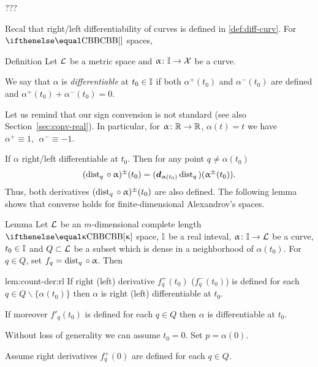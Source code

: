 ???
\qeds

Recal that right/left differentiability of curves is defined in \ref{def:diff-curv}.
For $\Alex{}$ spaces, 

\begin{thm}{Definition}\label{def:diff-curv???}
Let
$\mathcal{L}$ be a metric space 
and $\alpha\:\II\to \spc{X}$ be a curve.

We say that $\alpha$ is \emph{differentiable} at $t_0\in\II$ if 
both $\alpha^+(t_0)$ and $\alpha^-(t_0)$ are defined and $\alpha^+(t_0)+\alpha^-(t_0)=0$.
\end{thm}





Let us remind that our sign convension is not standard (see also Section~\ref{sec:conv-real}). 
In particular, for $\alpha\:\RR\to \RR$, $\alpha(t)=t$ we have $\alpha^+\equiv 1,\ \ \alpha^-\equiv -1$.

If $\alpha$ right/left differentiable at $t_0$.
Then for any point $q\not=\alpha(t_0)$
\[(\distfun{q}{}{}\circ\alpha)^\pm(t_0)
=
(\d_{\alpha(t_0)}\distfun{q}{}{})(\alpha^\pm(t_0)).\]
Thus, both derivatives $(\distfun{q}{}{}\circ\alpha)^\pm(t_0)$ are also defined.
The following lemma shows that converse holds for finite-dimensional Alexandrov's spaces.


\begin{thm}{Lemma}\label{lem:count-der}
Let $\mathcal{L}$ be an $m$-dimensional complete length $\Alex\kappa$ space,
$\mathbb{I}$ be a real inteval,
$\alpha\:\II\to \spc{L}$ be a curve,
$t_0\in\II$ 
and $Q\subset \spc{L}$ be a subset which is dense in a neighborhood of $\alpha(t_0)$.
For $q\in Q$, set $f_q=\distfun{q}{}{}\circ\alpha$.
Then 
\begin{subthm}{lem:count-der:rl}
If right (left) derivative $f^+_q(t_0)$ ($f^-_q(t_0)$) is defined for each $q\in Q\backslash \{\alpha(t_0)\}$ then $\alpha$ is right (left) differentiable at $t_0$.
\end{subthm}

\begin{subthm}{} If moreover $f'_q(t_0)$ is defined for each $q\in Q$ then $\alpha$ is differentiable at $t_0$.
\end{subthm}
\end{thm}



Without loss of generality we can assume $t_0=0$. Set $p=\alpha(0)$.

Assume right derivatives $f^+_q(0)$ are defined for each $q\in Q$.


